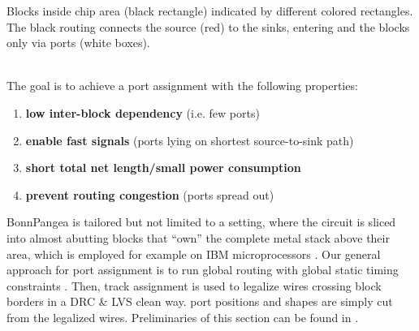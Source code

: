\documentclass[a2paper]{bigsposter}
\begin{document}
\begin{blockrow}[3]
\begin{minipage}{0.45\blockwidth}
    \raggedright
    {\footnotesize \begin{spacing}{0.9}
    		Blocks inside chip area (black rectangle) indicated by different colored rectangles. The black routing connects the source (red) to the sinks, entering and the blocks only via ports (white boxes).\end{spacing}	}
    \end{minipage}\\

 \label{sec:modfied_global;_routing}
 The goal is to achieve a port assignment with the following properties:
 \begin{enumerate}
 	\item \textbf{low inter-block dependency} (i.e. few ports)
 	\item \textbf{enable fast signals} (ports lying on shortest source-to-sink path)
 	\item \textbf{short total net length/small power consumption}
 	\item \textbf{prevent routing congestion} (ports spread out)
 \end{enumerate}
 BonnPangea is tailored but not limited to a setting, where the
 circuit is sliced into almost abutting blocks that ``own'' the
 complete metal stack above their area, which is employed for example
 on IBM microprocessors \cite{kazda+pangea:21}.
Our general approach for port assignment is to run global routing with
global static timing constraints \cite{BRGTiming2}. Then, track
assignment \cite{BatterywalaTrackAssign,duran:2024} is used  to legalize wires crossing block borders in a DRC \& LVS clean way.
port positions and shapes are simply cut from the legalized wires.
Preliminaries of this section can be found in \cite{kazda+pangea:21}. 


\end{blockrow}
\end{document}
